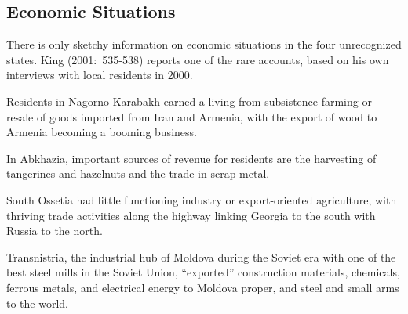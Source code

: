 \documentclass[12pt,a4paper]{article}%
\begin{document}
\subsection{Economic Situations}\label{economic}
There is only sketchy information on economic situations in the four unrecognized states. King (2001:\ 535-538) reports one of the rare accounts, based on his own interviews with local residents in 2000. 

Residents in Nagorno-Karabakh earned a living from subsistence farming or resale of goods imported from Iran and Armenia, with the export of wood to Armenia becoming a booming business. 

In Abkhazia, important sources of revenue for residents are the harvesting of tangerines and hazelnuts and the trade in scrap metal. 

South Ossetia had little functioning industry or export-oriented agriculture, with thriving trade activities along the highway linking Georgia to the south with Russia to the north. 

Transnistria, the industrial hub of Moldova during the Soviet era with one of the best steel mills in the Soviet Union, ``exported'' construction materials, chemicals, ferrous metals, and electrical energy to Moldova proper, and steel and small arms to the world.


\end{document}

